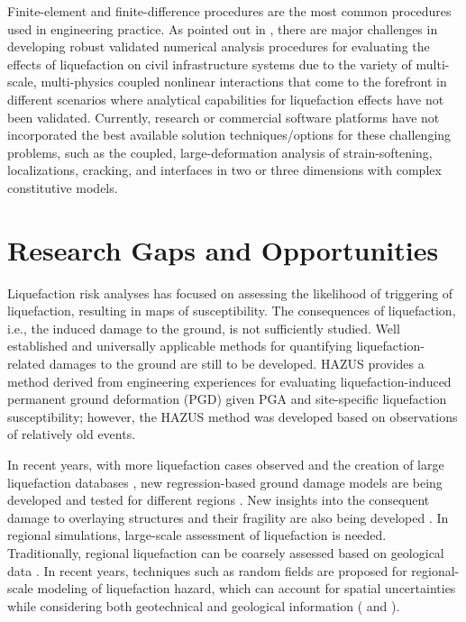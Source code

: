 Finite-element and finite-difference procedures are the most common procedures used in engineering practice. As pointed out in \citet{bray2017new}, there are major challenges in developing robust validated numerical analysis procedures for evaluating the effects of liquefaction on civil infrastructure systems due to the variety of multi-scale, multi-physics coupled nonlinear interactions that come to the forefront in different scenarios where analytical capabilities for liquefaction effects have not been validated. Currently, research or commercial software platforms have not incorporated the best available solution techniques/options for these challenging problems, such as the coupled, large-deformation analysis of strain-softening, localizations, cracking, and interfaces in two or three dimensions with complex constitutive models. 

\section{Research Gaps and Opportunities}
\label{sec:eq_liq_gaps}

Liquefaction risk analyses has focused on assessing the likelihood of triggering of liquefaction, resulting in maps of susceptibility. The consequences of liquefaction, i.e., the induced damage to the ground, is not sufficiently studied. Well established and universally applicable methods for quantifying liquefaction-related damages to the ground are still to be developed. HAZUS provides a method derived from engineering experiences for evaluating liquefaction-induced permanent ground deformation (PGD) given PGA and site-specific liquefaction susceptibility; however, the HAZUS method was developed based on observations of relatively old events.

In recent years, with more liquefaction cases observed \citep{cubrinovski2017liquefaction,bray2017new} and the creation of large liquefaction databases \citep{brandenberg2020nextgeneration}, new regression-based ground damage models are being developed \citep{khoshnevisan2015probabilistic,stewart2016peerngl} and tested for different regions \citep{chen2016probabilistic}. New insights into the consequent damage to overlaying structures and their fragility are also being developed \citep{bray20176th,fotopoulou2018vulnerability}. In regional simulations, large-scale assessment of liquefaction is needed. Traditionally, regional liquefaction can be coarsely assessed based on geological data \citep{holzer2006liquefaction}. In recent years, techniques such as random fields are proposed for regional-scale modeling of liquefaction hazard, which can account for spatial uncertainties while considering both geotechnical and geological information (\cite{zhu2017updated,wang2017spatial} and \cite{wang2018hybrid}).




